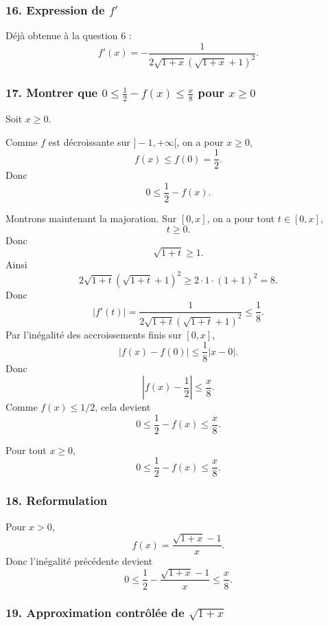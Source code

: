 \documentclass[11pt,a4paper]{article}
\begin{document}
\subsubsection*{16. Expression de \(f'\)}

Déjà obtenue à la question 6 :
\[
f'(x)
=
-\frac{1}{2\sqrt{1+x}(\sqrt{1+x}+1)^2}.
\]


\subsubsection*{17. Montrer que \(0\leq \frac12-f(x)\leq \frac{x}{8}\) pour \(x\geq0\)}

Soit \(x\geq0\).

Comme \(f\) est décroissante sur \(]-1,+\infty[\), on a pour \(x\geq0\),
\[
f(x)\leq f(0)=\frac12.
\]
Donc
\[
0\leq \frac12-f(x).
\]

Montrons maintenant la majoration. Sur \([0,x]\), on a pour tout \(t\in[0,x]\),
\[
t\geq0.
\]
Donc
\[
\sqrt{1+t}\geq1.
\]
Ainsi
\[
2\sqrt{1+t}(\sqrt{1+t}+1)^2
\geq
2\cdot1\cdot(1+1)^2
=
8.
\]
Donc
\[
|f'(t)|
=
\frac1{2\sqrt{1+t}(\sqrt{1+t}+1)^2}
\leq
\frac18.
\]
Par l'inégalité des accroissements finis sur \([0,x]\),
\[
|f(x)-f(0)|\leq \frac18 |x-0|.
\]
Donc
\[
\left|f(x)-\frac12\right|\leq \frac{x}{8}.
\]
Comme \(f(x)\leq1/2\), cela devient
\[
0\leq \frac12-f(x)\leq \frac{x}{8}.
\]

\begin{resultatbox}
Pour tout \(x\geq0\),
\[
0\leq \frac12-f(x)\leq \frac{x}{8}.
\]
\end{resultatbox}


\subsubsection*{18. Reformulation}

Pour \(x>0\),
\[
f(x)=\frac{\sqrt{1+x}-1}{x}.
\]
Donc l'inégalité précédente devient
\[
0\leq \frac12-\frac{\sqrt{1+x}-1}{x}\leq \frac{x}{8}.
\]


\subsubsection*{19. Approximation contrôlée de \(\sqrt{1+x}\)}
\end{document}

